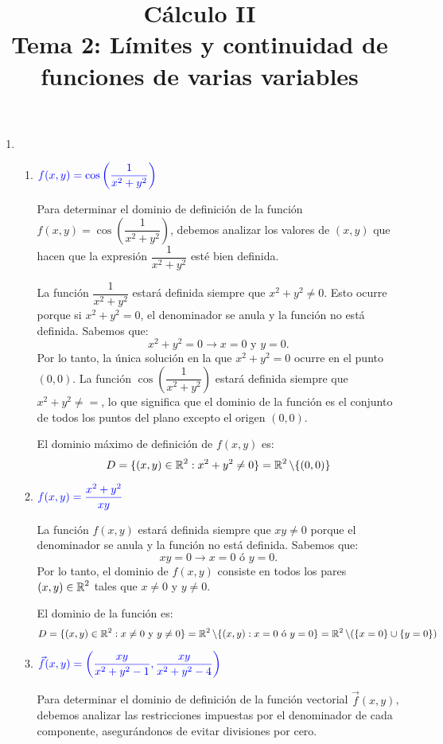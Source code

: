 
\title{Cálculo II\\ Tema 2: Límites y continuidad de funciones de varias variables}

\maketitle
\begin{enumerate}[label=\color{red}\textbf{\arabic*)}, leftmargin=*]
\item {}
\begin{enumerate}[label=\color{red}\textbf{\alph*)}]
\item $\textcolor{blue}{f(x,y)=\cos\left(\dfrac{1}{x^2+y^2}\right)}$

Para determinar el dominio de definición de la función $f(x,y)=\cos\left(\dfrac{1}{x^2+y^2}\right)$, debemos analizar los valores de $(x,y)$ que hacen que la expresión $\dfrac{1}{x^2+y^2}$ esté bien definida.

La función $\dfrac{1}{x^2+y^2}$ estará definida siempre que $x^2+y^2\neq0$. Esto ocurre porque si $x^2+y^2=0$, el denominador se anula y la función no está definida. Sabemos que: $$
x^2+y^2=0\longrightarrow x=0\text{ y }y=0.
$$
Por lo tanto, la única solución en la que $x^2+y^2=0$ ocurre en el punto $(0,0)$. La función $\cos\left(\dfrac{1}{x^2+y^2}\right)$ estará definida siempre que $x^2+y^2\neq=$, lo que significa que el dominio de la función es el conjunto de todos los puntos del plano excepto el origen $(0,0)$.

El dominio máximo de definición de $f(x,y)$ es: $$D=\{(x,y)\in\operatorname{\mathbb{R}}^2:x^2+y^2\neq0\}=\operatorname{\mathbb{R}}^2\backslash\{(0,0)\}$$

\item $\textcolor{blue}{f(x,y)=\dfrac{x^2+y^2}{xy}}$

La función $f(x,y)$ estará definida siempre que $xy\neq0$ porque el denominador se anula y la función no está definida. Sabemos que: $$xy=0\longrightarrow x=0\text{ ó }y=0.$$
Por lo tanto, el dominio de $f(x,y)$ consiste en todos los pares $(x,y)\in\operatorname{\mathbb{R}}^2$ tales que $x\neq0$ y $y\neq0$.

El dominio de la función es: $$D=\{(x,y)\in\operatorname{\mathbb{R}}^2:x\neq0\text{ y }y\neq0\}=\operatorname{\mathbb{R}}^2\backslash\{(x,y):x=0\text{ ó }y=0\}=\operatorname{\mathbb{R}}^2\backslash(\{x=0\}\cup\{y=0\})$$

\item $\textcolor{blue}{\vec{f}(x,y)=\left(\dfrac{xy}{x^2+y^2-1},\dfrac{xy}{x^2+y^2-4}\right)}$

Para determinar el dominio de definición de la función vectorial $\vec{f}(x,y)$, debemos analizar las restricciones impuestas por el denominador de cada componente, asegurándonos de evitar divisiones por cero.


\end{enumerate}
\end{enumerate}
